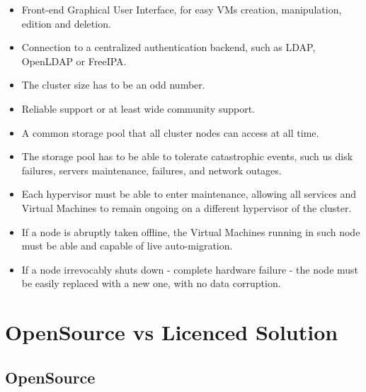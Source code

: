 \begin{itemize}
  \item Front-end Graphical User Interface, for easy VMs creation, manipulation, edition and deletion.
  \item Connection to a centralized authentication backend, such as LDAP, OpenLDAP or FreeIPA.
  \item The cluster size has to be an odd number.
  \item Reliable support or at least wide community support.
  \item A common storage pool that all cluster nodes can access at all time.
  \item The storage pool has to be able to tolerate catastrophic events, such us disk failures, servers maintenance, failures, and network outages.
  \item Each hypervisor must be able to enter maintenance, allowing all services and Virtual Machines to remain ongoing on a different hypervisor of the cluster.
  \item If a node is abruptly taken offline, the Virtual Machines running in such node must be able and capable of live auto-migration.
  \item If a node irrevocably shuts down - complete hardware failure - the node must be easily replaced with a new one, with no data corruption.
\end{itemize}

\newpage
\section{OpenSource vs Licenced Solution}

\newpage
\subsection{OpenSource}


